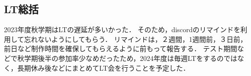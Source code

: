 \subsection*{LT総括}


2023年度秋学期はLTの遅延が多いかった．
そのため，discordのリマインドを利用して忘れないようにしてもらう．
リマインドは，２週間，1週間前，３日前，前日など制作時間を確保してもらえるように前もって報告する．
テスト期間などで秋学期後半の参加率少なめだったため，2024年度は毎週LTをするのではなく，長期休み後などにまとめてLT会を行うことを予定した．
